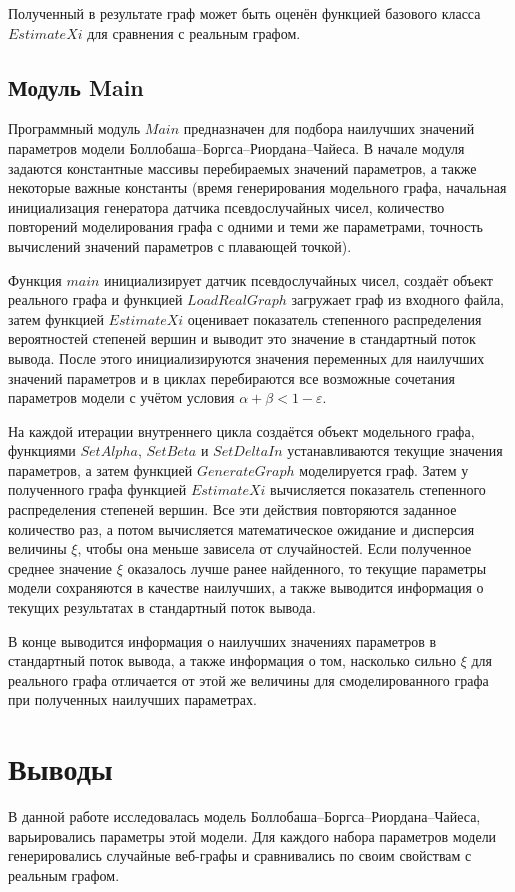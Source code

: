 \documentclass[14pt]{extreport}
\begin{document}
Полученный в результате граф может быть оценён функцией базового класса $EstimateXi$ для сравнения с реальным графом.

\section{Модуль Main}

Программный модуль $Main$ предназначен для подбора наилучших значений параметров модели Боллобаша--Боргса--Риордана--Чайеса. В начале модуля задаются константные массивы перебираемых значений параметров, а также некоторые важные константы (время генерирования модельного графа, начальная инициализация генератора датчика псевдослучайных чисел, количество повторений моделирования графа с одними и теми же параметрами, точность вычислений значений параметров с плавающей точкой).

Функция $main$ инициализирует датчик псевдослучайных чисел, создаёт объект реального графа и функцией $LoadRealGraph$ загружает граф из входного файла, затем функцией $EstimateXi$ оценивает показатель степенного распределения вероятностей степеней вершин и выводит это значение в стандартный поток вывода. После этого инициализируются значения переменных для наилучших значений параметров и в циклах перебираются все возможные сочетания параметров модели с учётом условия $\alpha + \beta < 1 - \varepsilon$.

На каждой итерации внутреннего цикла создаётся объект модельного графа, функциями $SetAlpha$, $SetBeta$ и $SetDeltaIn$ устанавливаются текущие значения параметров, а затем функцией $GenerateGraph$ моделируется граф. Затем у полученного графа функцией $EstimateXi$ вычисляется показатель степенного распределения степеней вершин. Все эти действия повторяются заданное количество раз, а потом вычисляется математическое ожидание и дисперсия величины $\xi$, чтобы она меньше зависела от случайностей. Если полученное среднее значение $\xi$ оказалось лучше ранее найденного, то текущие параметры модели сохраняются в качестве наилучших, а также выводится информация о текущих результатах в стандартный поток вывода.

В конце выводится информация о наилучших значениях параметров в стандартный поток вывода, а также информация о том, насколько сильно $\xi$ для реального графа отличается от этой же величины для смоделированного графа при полученных наилучших параметрах.

\chapter{Выводы}
В данной работе исследовалась модель Боллобаша--Боргса--Риордана--Чайеса, варьировались параметры этой модели. Для каждого набора параметров модели генерировались случайные веб-графы и сравнивались по своим свойствам с реальным графом.
\end{document}

